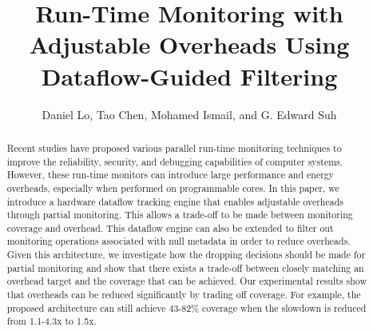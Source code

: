 \title{
Run-Time Monitoring with Adjustable Overheads Using Dataflow-Guided Filtering
}

{\author{Daniel Lo, Tao Chen, Mohamed Ismail, and G. Edward Suh}}

\date{}
\maketitle

\thispagestyle{empty}

\begin{abstract}

Recent studies have proposed various parallel run-time monitoring techniques to
improve the reliability, security, and debugging capabilities of computer
systems. However, these run-time monitors can introduce large performance and energy
overheads, especially when performed on programmable cores.
In this paper, we introduce a hardware dataflow tracking engine that enables
adjustable overheads through partial monitoring. This allows a trade-off to be
made between monitoring coverage and overhead. This dataflow engine
can also be extended to filter out monitoring operations associated with null
metadata in order to reduce overheads.
Given this architecture, we investigate how the dropping decisions should be
made for partial monitoring and show that there exists a trade-off between closely
matching an overhead target and the coverage that can be achieved.
Our experimental results show that overheads can be reduced significantly 
by trading off coverage. For example, the proposed architecture can still
achieve 43-82\% coverage when the slowdown is reduced from 1.1-4.3x to 1.5x.

\end{abstract}
